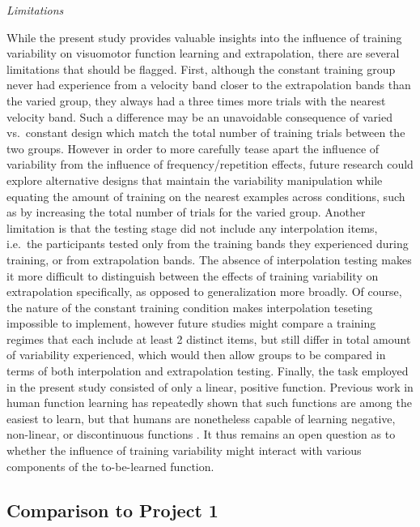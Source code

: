 \documentclass[
  12pt,
  letterpaper,
]{article}
\begin{document}
\emph{Limitations}

While the present study provides valuable insights into the influence of
training variability on visuomotor function learning and extrapolation,
there are several limitations that should be flagged. First, although
the constant training group never had experience from a velocity band
closer to the extrapolation bands than the varied group, they always had
a three times more trials with the nearest velocity band. Such a
difference may be an unavoidable consequence of varied vs.~constant
design which match the total number of training trials between the two
groups. However in order to more carefully tease apart the influence of
variability from the influence of frequency/repetition effects, future
research could explore alternative designs that maintain the variability
manipulation while equating the amount of training on the nearest
examples across conditions, such as by increasing the total number of
trials for the varied group. Another limitation is that the testing
stage did not include any interpolation items, i.e.~the participants
tested only from the training bands they experienced during training, or
from extrapolation bands. The absence of interpolation testing makes it
more difficult to distinguish between the effects of training
variability on extrapolation specifically, as opposed to generalization
more broadly. Of course, the nature of the constant training condition
makes interpolation teseting impossible to implement, however future
studies might compare a training regimes that each include at least 2
distinct items, but still differ in total amount of variability
experienced, which would then allow groups to be compared in terms of
both interpolation and extrapolation testing. Finally, the task employed
in the present study consisted of only a linear, positive function.
Previous work in human function learning has repeatedly shown that such
functions are among the easiest to learn, but that humans are
nonetheless capable of learning negative, non-linear, or discontinuous
functions
\autocite{deloshExtrapolationSineQua1997,mcdanielPredictingTransferPerformance2009,kalishLearningExtrapolatingPeriodic2013,busemeyerLearningFunctionalRelations1997}.
It thus remains an open question as to whether the influence of training
variability might interact with various components of the to-be-learned
function.

\subsection{Comparison to Project 1}\label{comparison-to-project-1}
\end{document}
